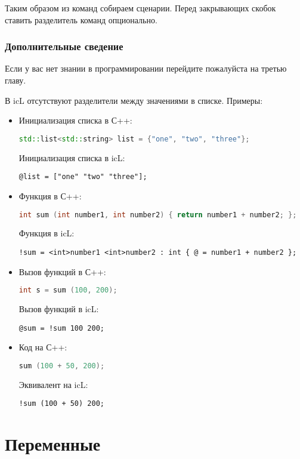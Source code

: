 \documentclass[a4paper, 14pt]{extarticle}
\newenvironment{icItems}
	{ \begin{itemize} [noitemsep,nolistsep] }
	{ \end{itemize} }
\begin{document}
	Таким образом из команд собираем сценарии. Перед закрывающих скобок ставить разделитель команд опционально.
	
\subsubsection{Дополнительные сведение}
	
	Если у вас нет знании в программировании перейдите пожалуйста на третью главу.
	
	В icL отсутствуют разделители между значениями в списке. Примеры:
\begin{icItems}
  \item Инициализация списка в С++:
\begin{lstlisting}[numbers=none, language=C++]
std::list<std::string> list = {"one", "two", "three"};
\end{lstlisting}
	Инициализация списка в icL:
\begin{lstlisting}[numbers=none]
@list = ["one" "two" "three"];
\end{lstlisting}
  \item Функция в С++:
\begin{lstlisting}[numbers=none, language=C++]
int sum (int number1, int number2) { return number1 + number2; };
\end{lstlisting}
	Функция в icL:
\begin{lstlisting}[numbers=none]
!sum = <int>number1 <int>number2 : int { @ = number1 + number2 };
\end{lstlisting}
  \item Вызов функций в С++:
\begin{lstlisting}[numbers=none, language=C++]
int s = sum (100, 200);
\end{lstlisting}
	Вызов функций в icL:
\begin{lstlisting}[numbers=none]
@sum = !sum 100 200;
\end{lstlisting}
  \item Код на С++:
\begin{lstlisting}[numbers=none, language=C++]
sum (100 + 50, 200);
\end{lstlisting}
	Эквивалент на icL:
\begin{lstlisting}[numbers=none]
!sum (100 + 50) 200;
\end{lstlisting}
\end{icItems}

\newpage
\section{Переменные}  
	
\end{document}
